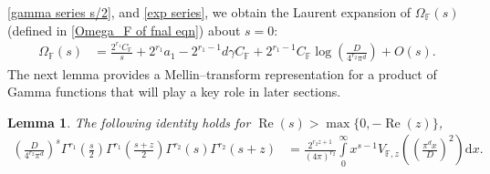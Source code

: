 \documentclass[12pt,reqno]{amsart}
\renewcommand{\Re}{\operatorname{Re}}
\renewcommand{\(}{\left\(}
\renewcommand{\)}{\right\)}
\renewcommand{\[}{\left\[}
\renewcommand{\]}{\right\]}
\numberwithin{equation}{section}
\theoremstyle{plain}
\newtheorem{lemma}[theorem]{Lemma}
\begin{document}
\eqref{gamma series s/2}, and \eqref{exp series}, we obtain the Laurent expansion of
$\Omega_{\mathbb{F}}(s)$ (defined in \eqref{Omega_F of fnal eqn}) about $s=0$:
\begin{align}\label{Omega series}
\Omega_{\mathbb{F}}(s) &= \frac{2^{r_1}C_{\mathbb{F}}}{s} + 2^{r_1}a_1 - 2^{r_1-1}d\gamma C_{\mathbb{F}} + 2^{r_1-1}C_{\mathbb{F}}\log\!\left(\frac{D}{4^{r_2}\pi^{d}}\right) + O(s).
\end{align}
The next lemma provides a Mellin–transform representation for a product of Gamma
functions that will play a key role in later sections.
\begin{lemma}\label{Lemma for Mellin trans}
The following identity holds for $\Re(s) > \max\{0, -\Re(z)\}$,
\begin{align*}
\left(\frac{D}{4^{r_2}\pi^{d}}\right)^{s}\Gamma^{r_1}\left(\frac{s}{2}\right)\Gamma^{r_1}\left(\frac{s+z}{2}\right)\Gamma^{r_2}(s)\Gamma^{r_2}(s+z)
&= \frac{2^{r_2 z + 1}}{(4\pi)^{r_2}}\int\limits_{0}^\infty x^{s-1}V_{\mathbb{F},z}\left(\left(\frac{\pi^{d} x}{D}\right)^2\right) \mathrm{d}x.
\end{align*}
\end{lemma}
\end{document}
